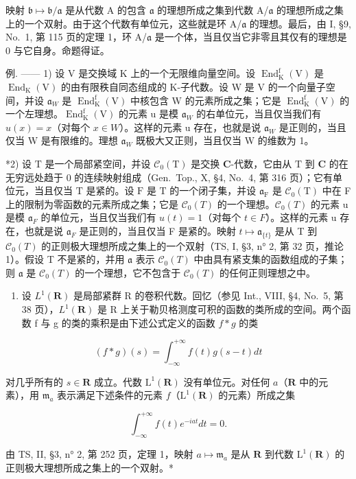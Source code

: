 映射 \(\mathfrak{b} \mapsto \mathfrak{b}/\mathfrak{a}\) 是从代数 A 的包含 \(\mathfrak{a}\) 的理想所成之集到代数 A/\(\mathfrak{a}\) 的理想所成之集上的一个双射。由于这个代数有单位元，这些就是环 A/\(\mathfrak{a}\) 的理想。最后，由 I, §9, No.~1, 第 115 页的定理 1，环 A/\(\mathfrak{a}\) 是一个体，当且仅当它非零且其仅有的理想是 0 与它自身。命题得证。

例. —— 1) 设 V 是交换域 K 上的一个无限维向量空间。设 \(\operatorname{End}_{\mathrm{K}}^{\mathrm{f}}(\mathrm{V})\) 是 \(\operatorname{End}_{\mathrm{K}}(\mathrm{V})\) 的由有限秩自同态组成的 K-子代数。设 W 是 V 的一个向量子空间，并设 \(\mathfrak{a}_{W}\) 是 \(\operatorname{End}_{\mathrm{K}}^{\mathrm{f}}(\mathrm{V})\) 中核包含 W 的元素所成之集；它是 \(\operatorname{End}_{\mathrm{K}}^{\mathrm{f}}(\mathrm{V})\) 的一个左理想。\(\operatorname{End}_{\mathrm{K}}^{\mathrm{f}}(\mathrm{V})\) 的元素 u 是模 \(\mathfrak{a}_{W}\) 的右单位元，当且仅当我们有 \(u(x)=x\)（对每个 \(x\in W\)）。这样的元素 u 存在，也就是说 \(\mathfrak{a}_{W}\) 是正则的，当且仅当 W 是有限维的。理想 \(\mathfrak{a}_{W}\) 既极大又正则，当且仅当 W 的维数为 1。

*2) 设 \(\mathrm{T}\) 是一个局部紧空间，并设 \(\mathcal{C}_0(\mathrm{T})\) 是交换 \(\mathbf{C}\)-代数，它由从 \(\mathrm{T}\) 到 \(\mathbf{C}\) 的在无穷远处趋于 0 的连续映射组成（Gen.~Top., X, §4, No.~4, 第 316 页）；它有单位元，当且仅当 \(\mathrm{T}\) 是紧的。设 \(\mathrm{F}\) 是 \(\mathrm{T}\) 的一个闭子集，并设 \(\mathfrak{a}_{\mathrm{F}}\) 是 \(\mathcal{C}_0(\mathrm{T})\) 中在 F 上的限制为零函数的元素所成之集；它是 \(\mathcal{C}_{0}(T)\) 的一个理想。\(\mathcal{C}_{0}(T)\) 的元素 u 是模 \(\mathfrak{a}_{F}\) 的单位元，当且仅当我们有 \(u(t)=1\)（对每个 \(t\in F\)）。这样的元素 u 存在，也就是说 \(\mathfrak{a}_{F}\) 是正则的，当且仅当 F 是紧的。映射 \(t\mapsto \mathfrak{a}_{\{t\}}\) 是从 T 到 \(\mathcal{C}_{0}(T)\) 的正则极大理想所成之集上的一个双射（TS, I, §3, n° 2, 第 32 页，推论 1）。假设 T 不是紧的，并用 \(\mathfrak{a}\) 表示 \(\mathcal{C}_{0}(T)\) 中由具有紧支集的函数组成的子集；则 \(\mathfrak{a}\) 是 \(\mathcal{C}_{0}(T)\) 的一个理想，它不包含于 \(\mathcal{C}_{0}(T)\) 的任何正则理想之中。

\begin{enumerate}
\def\labelenumi{\arabic{enumi})}
\setcounter{enumi}{2}
\tightlist
\item
  设 \(L^{1}(\mathbf{R})\) 是局部紧群 R 的卷积代数。回忆（参见 Int., VIII, §4, No.~5, 第 38 页），\(L^{1}(\mathbf{R})\) 是 R 上关于勒贝格测度可积的函数的类所成的空间。两个函数 f 与 g 的类的乘积是由下述公式定义的函数 \(f * g\) 的类
\end{enumerate}

\[
(f * g) (s) = \int_ {- \infty} ^ {+ \infty} f (t) g (s - t) d t
\]

对几乎所有的 \(s \in \mathbf{R}\) 成立。代数 \(\mathrm{L}^1(\mathbf{R})\) 没有单位元。对任何 \(a\)（\(\mathbf{R}\) 中的元素），用 \(\mathfrak{m}_a\) 表示满足下述条件的元素 \(f\)（\(\mathrm{L}^1(\mathbf{R})\) 的元素）所成之集

\[
\int_ {- \infty} ^ {+ \infty} f (t) e ^ {- i a t} d t = 0.
\]

由 TS, II, §3, n° 2, 第 252 页，定理 1，映射 \(a \mapsto \mathfrak{m}_a\) 是从 \(\mathbf{R}\) 到代数 \(\mathrm{L}^1(\mathbf{R})\) 的正则极大理想所成之集上的一个双射。*

